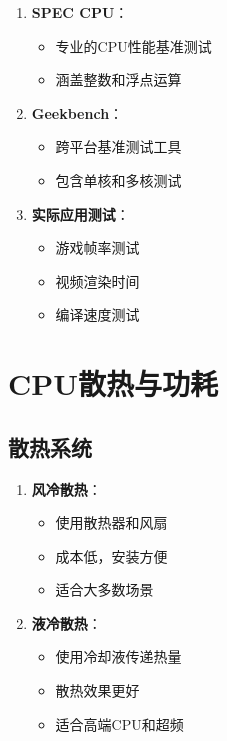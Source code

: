 \documentclass[12pt,UTF8]{ctexbook}
\begin{document}
\begin{enumerate}
    \item \textbf{SPEC CPU}：
    \begin{itemize}[leftmargin=2em]
        \item 专业的CPU性能基准测试
        \item 涵盖整数和浮点运算
    \end{itemize}
    
    \item \textbf{Geekbench}：
    \begin{itemize}[leftmargin=2em]
        \item 跨平台基准测试工具
        \item 包含单核和多核测试
    \end{itemize}
    
    \item \textbf{实际应用测试}：
    \begin{itemize}[leftmargin=2em]
        \item 游戏帧率测试
        \item 视频渲染时间
        \item 编译速度测试
    \end{itemize}
\end{enumerate}

\chapter{CPU散热与功耗}

\section{散热系统}

\begin{enumerate}
    \item \textbf{风冷散热}：
    \begin{itemize}[leftmargin=2em]
        \item 使用散热器和风扇
        \item 成本低，安装方便
        \item 适合大多数场景
    \end{itemize}
    
    \item \textbf{液冷散热}：
    \begin{itemize}[leftmargin=2em]
        \item 使用冷却液传递热量
        \item 散热效果更好
        \item 适合高端CPU和超频
    \end{itemize}
\end{enumerate}
\end{document}
